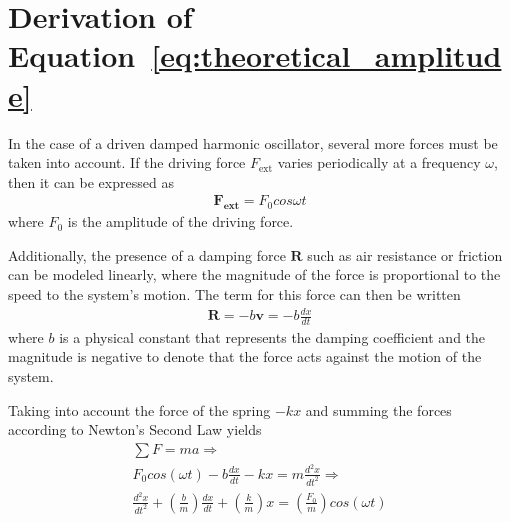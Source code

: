 \documentclass[twocolumn,english]{IEEEtran}
\theoremstyle{plain}
\theoremstyle{plain}
\begin{document}
\section{Derivation of Equation~\ref{eq:theoretical_amplitude}}\label{append:amp_deriv}
 In the case of a driven damped harmonic oscillator, several more forces must be taken into account. If the driving force $F_{\text{ext}}$ varies periodically at a frequency $\omega$, then it can be expressed as
 \begin{align*}
  \mathbf{F_{\text{ext}}} = F_0 cos\omega t
 \end{align*}
 where $F_0$ is the amplitude of the driving force.

 Additionally, the presence of a damping force $\mathbf{R}$ such as air resistance or friction can be modeled linearly, where the magnitude of the force is proportional to the speed to the system's motion. The term for this force can then be written
 \begin{align*}
  \mathbf{R} = -b\mathbf{v} = -b\frac{dx}{dt}
 \end{align*}
 where $b$ is a physical constant that represents the damping coefficient and the magnitude is negative to denote that the force acts against the motion of the system.

 Taking into account the force of the spring $-kx$ and summing the forces according to Newton's Second Law yields
 \begin{gather*}
  \sum F = ma \Rightarrow \\
  F_0 cos(\omega t) - b \frac{dx}{dt} - kx = m\frac{d^2x}{dt^2} \Rightarrow \\
  \frac{d^2x}{dt^2}+ \left(\frac{b}{m}\right) \frac{dx}{dt} + \left(\frac{k}{m}\right)x = \left(\frac{F_0}{m}\right) cos(\omega t)
 \end{gather*}
\end{document}
